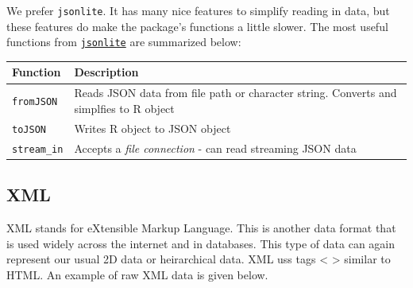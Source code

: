\documentclass[
]{book}
\theoremstyle{definition}
\theoremstyle{definition}
\theoremstyle{definition}
\theoremstyle{remark}
\begin{document}
We prefer \texttt{jsonlite}. It has many nice features to simplify reading in data, but these features do make the package's functions a little slower. The most useful functions from \href{https://www.rdocumentation.org/packages/jsonlite/versions/1.6}{\texttt{jsonlite}} are summarized below:

\begin{longtable}[]{@{}ll@{}}
\toprule
\begin{minipage}[b]{0.17\columnwidth}\raggedright
Function\strut
\end{minipage} & \begin{minipage}[b]{0.77\columnwidth}\raggedright
Description\strut
\end{minipage}\tabularnewline
\midrule
\endhead
\begin{minipage}[t]{0.17\columnwidth}\raggedright
\texttt{fromJSON}\strut
\end{minipage} & \begin{minipage}[t]{0.77\columnwidth}\raggedright
Reads JSON data from file path or character string. Converts and simplfies to R object\strut
\end{minipage}\tabularnewline
\begin{minipage}[t]{0.17\columnwidth}\raggedright
\texttt{toJSON}\strut
\end{minipage} & \begin{minipage}[t]{0.77\columnwidth}\raggedright
Writes R object to JSON object\strut
\end{minipage}\tabularnewline
\begin{minipage}[t]{0.17\columnwidth}\raggedright
\texttt{stream\_in}\strut
\end{minipage} & \begin{minipage}[t]{0.77\columnwidth}\raggedright
Accepts a \emph{file connection} - can read streaming JSON data\strut
\end{minipage}\tabularnewline
\bottomrule
\end{longtable}

\hypertarget{xml-1}{%
\subsection{XML}\label{xml-1}}

XML stands for eXtensible Markup Language. This is another data format that is used widely across the internet and in databases. This type of data can again represent our usual 2D data or heirarchical data. XML uss tags \textless{} \textgreater{} similar to HTML. An example of raw XML data is given below.
\end{document}
